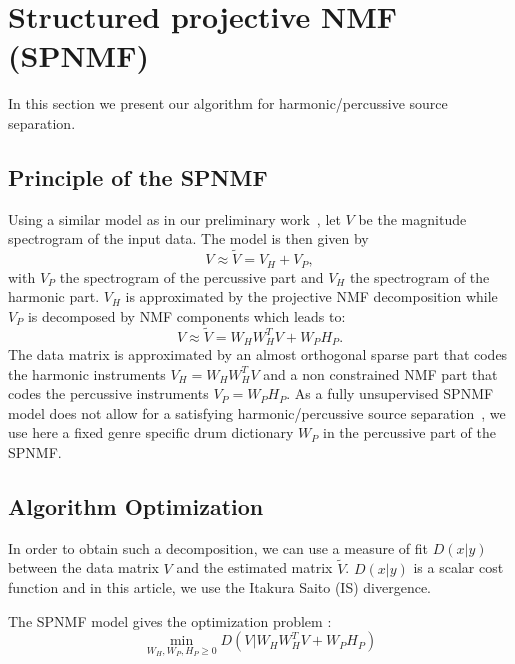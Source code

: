 \documentclass{article}
\begin{document}
\section{Structured projective NMF (SPNMF)}
\label{sec:SPNMF}

In this section we present our algorithm for harmonic/percussive source separation.


\subsection{Principle of the SPNMF}

Using a similar model as in our preliminary work~\cite{laroche2015structured}, let $V$ be the magnitude spectrogram of the input data. The model is then given by
\begin{equation} \label{Cfunction}
V \approx \tilde{V}= V_H + V_{P},
\end{equation}
with $V_P$ the spectrogram of the percussive part and $V_H$ the spectrogram of the harmonic part. $V_H$ is approximated by the projective NMF decomposition \cite{yuanOja2005} while $V_P$ is decomposed by NMF components which leads to:
\begin{equation}
V \approx \tilde{V}= W_{H}W_{H}^{T}V + W_{P} H_{P}.
\end{equation}
The data matrix is approximated by an almost orthogonal sparse part that codes the harmonic instruments $V_H = W_HW_H^T V$ and a non constrained NMF part that codes the percussive instruments $V_P = W_PH_P$. As a fully unsupervised SPNMF model does not allow for a satisfying harmonic/percussive source separation~\cite{laroche2015structured}, we use here a fixed genre specific drum dictionary $W_P$ in the percussive part of the SPNMF.



\subsection{Algorithm Optimization}

In order to obtain such a decomposition, we can use a measure of fit $D(x|y)$ between the data matrix $V$ and the estimated matrix $\tilde{V}$. $D(x|y)$ is a scalar cost function and in this article, we use the Itakura Saito (IS) divergence.

The SPNMF model gives the optimization problem : 
\begin{equation}\label{InitCost}
\min_{W_H,W_P,H_P \geq 0} D(V|W_{H}W_{H}^{T}V + W_{P} H_{P})  
\end{equation}
\end{document}
